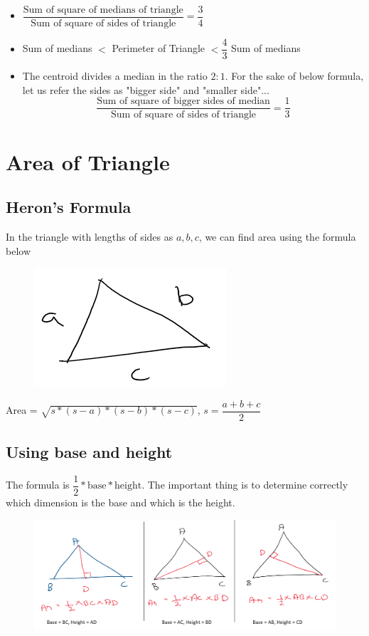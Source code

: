 \begin{itemize}
    \item $\dfrac{\text{Sum of square of medians of triangle}}{\text{Sum of square of sides of triangle}} = \dfrac{3}{4}$

    \item Sum of medians $<$ Perimeter of Triangle $< \dfrac{4}{3}$ Sum of medians
    \item The centroid divides a median in the ratio $2 : 1$. For the sake of below formula, let us refer the sides as "bigger side" and "smaller side"... 
    $$
    \dfrac{ \text{Sum of square of bigger sides of median} }{ \text{Sum of square of sides of triangle} } = \dfrac{1}{3}
    $$
\end{itemize}

\newpage 

\section{Area of Triangle}
\subsection{Heron's Formula}

In the triangle with lengths of sides as $a,b,c$, we can find area using the formula below

\begin{figure}[h!]
    \centering
    \includegraphics[width=0.4\linewidth]{Quant//Geometry//Images//Triangles/herons.png}
\end{figure}

Area = $\sqrt{ s * (s - a) * (s - b) * (s - c) }$, $s = \dfrac{a + b + c}{2}$

\subsection{Using base and height}

The formula is $\dfrac{1}{2} * \text{base} * \text{height}$. The important thing is to determine correctly which dimension is the base and which is the height. 

\begin{figure}[h!]
    \centering
    \includegraphics[width=1.0\linewidth]{Quant//Geometry//Images//Triangles/half_base_height.png}
\end{figure}


